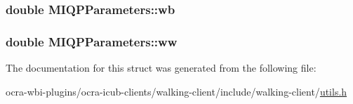 \hypertarget{structMIQPParameters_a6bc828e6060bfd69c3d6353a460de86b}{
\subsubsection[{wb}]{\setlength{\rightskip}{0pt plus 5cm}double {\bf \-M\-I\-Q\-P\-Parameters\-::wb}}}\label{structMIQPParameters_a6bc828e6060bfd69c3d6353a460de86b}
\hypertarget{structMIQPParameters_a7223a1cda1e4565d18729f1e7bba87e0}{
\subsubsection[{ww}]{\setlength{\rightskip}{0pt plus 5cm}double {\bf \-M\-I\-Q\-P\-Parameters\-::ww}}}\label{structMIQPParameters_a7223a1cda1e4565d18729f1e7bba87e0}


\-The documentation for this struct was generated from the following file\-:\begin{DoxyCompactItemize}
\item 
ocra-\/wbi-\/plugins/ocra-\/icub-\/clients/walking-\/client/include/walking-\/client/\hyperlink{utils_8h}{utils.\-h}\end{DoxyCompactItemize}
